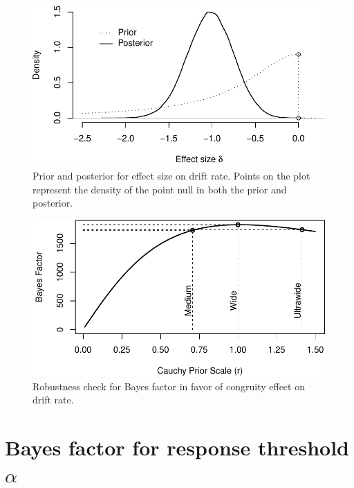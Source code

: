 \documentclass[english,floatsintext,doc]{apa6}
\theoremstyle{definition}
\theoremstyle{definition}
\theoremstyle{definition}
\theoremstyle{remark}
\begin{document}
\begin{figure}
\centering
\includegraphics{supplement_files/figure-latex/gammaPosterior-1.pdf}
\caption{\label{fig:gammaPosterior}Prior and posterior for effect size on
drift rate. Points on the plot represent the density of the point null
in both the prior and posterior.}
\end{figure}

\begin{figure}
\centering
\includegraphics{supplement_files/figure-latex/gammaRobustness-1.pdf}
\caption{\label{fig:gammaRobustness}Robustness check for Bayes factor in
favor of congruity effect on drift rate.}
\end{figure}

\section{\texorpdfstring{Bayes factor for response threshold
\(\alpha\)}{Bayes factor for response threshold \textbackslash{}alpha}}\label{bayes-factor-for-response-threshold-alpha}
\end{document}
